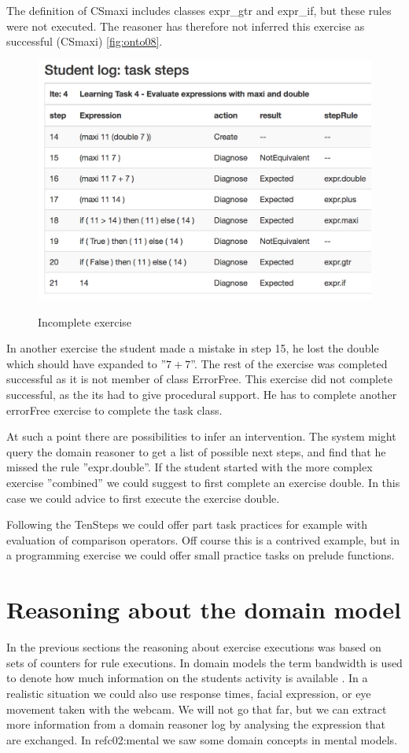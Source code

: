 The definition of CSmaxi includes classes expr\_gtr and expr\_if, but these rules were not executed.
The reasoner has therefore not inferred this exercise as successful (CSmaxi)  \ref{fig:onto08}.


\begin{figure}
\includegraphics[scale=0.7]{pictures/screen13.png}\\
\caption{Incomplete exercise}
\label{fig:onto09}
\end{figure}

In another exercise the student made a mistake in step 15, he lost the double which should have expanded to ''$7 + 7$''.
The rest of the exercise was completed successful as it is not member of class ErrorFree.
This exercise did not complete successful, as the \gls{its} had to give procedural support.
He has to complete another errorFree exercise to complete the task class.

At such a point there are possibilities to infer an intervention. 
The system might query the domain reasoner to get a list of possible next steps, and find that he missed the rule ''expr.double''.
If the student started with the more complex exercise ''combined'' we could suggest to first complete an exercise double.
In this case we could advice to first execute the exercise double.

Following the TenSteps we could offer part task practices for example with evaluation of comparison operators.
Off course this is a contrived example, but in a programming exercise we could offer small practice tasks on prelude functions.

\section{Reasoning about the domain model}
In the previous sections the reasoning about exercise executions was based on sets of counters for rule executions.
In domain models the term bandwidth is used to denote how much information on the students activity is available \citep{studentModelling}.
In a realistic situation we could also use response times, facial expression, or eye movement taken with the webcam.
We will not go that far, but we can extract more information from a domain reasoner log by analysing the expression that are exchanged.
In ref{c02:mental} we saw some domain concepts in mental models.

